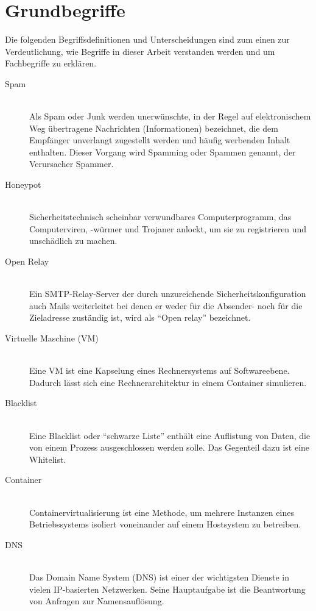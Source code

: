 \documentclass[a4paper,11pt,singlespacing]{article}
\begin{document}
\section{Grundbegriffe}\label{sec:Grundbegriffe}
	Die folgenden Begriffsdefinitionen und Unterscheidungen sind zum einen zur Verdeutlichung, wie Begriffe in dieser Arbeit verstanden werden und um Fachbegriffe zu erklären.
	
	\begin{description}
	\item[Spam\label{itm:Spam}]\hfill \\
		Als Spam oder Junk werden unerwünschte, in der Regel auf elektronischem Weg übertragene Nachrichten (Informationen) bezeichnet, die dem Empfänger unverlangt zugestellt werden und häufig werbenden Inhalt enthalten. Dieser Vorgang wird Spamming oder Spammen genannt, der Verursacher Spammer.\cite{Spam}
	\item[Honeypot\label{itm:Honeypot}]\hfill \\
		Sicherheitstechnisch scheinbar verwundbares Computerprogramm, das Computerviren, -würmer und Trojaner anlockt, um sie zu registrieren und unschädlich zu machen.\cite{Honeypot}
	\item[Open Relay\label{itm:OpenRelay}]\hfill \\
		Ein SMTP-Relay-Server der durch unzureichende Sicherheitskonfiguration auch Mails weiterleitet bei denen er weder für die Absender- noch für die Zieladresse zuständig ist, wird als "`Open relay"' bezeichnet.\cite{SMTP-Relay-Server}
	\item[Virtuelle Maschine (VM)\label{itm:VirtuelleMaschine}]\hfill \\
		Eine VM ist eine Kapselung eines Rechnersystems auf Softwareebene. Dadurch lässt sich eine Rechnerarchitektur in einem Container simulieren. \cite{VM}
	\item[Blacklist \label{itm:Blacklist}]\hfill \\
		Eine Blacklist oder "`schwarze Liste"' enthält eine Auflistung von Daten, die von einem Prozess ausgeschlossen werden solle. Das Gegenteil dazu ist eine Whitelist. \cite{Blacklist}
	\item[Container\label{itm:Container}]\hfill \\
		Containervirtualisierung ist eine Methode, um mehrere Instanzen eines Betriebssystems isoliert voneinander auf einem Hostsystem zu betreiben.\cite{Container}
	\item[DNS\label{itm:DNS}]\hfill \\
		Das Domain Name System (DNS) ist einer der wichtigsten Dienste in vielen IP-basierten Netzwerken. Seine Hauptaufgabe ist die Beantwortung von Anfragen zur Namensauflösung.\cite{DNS}

\end{description}
\end{document}
